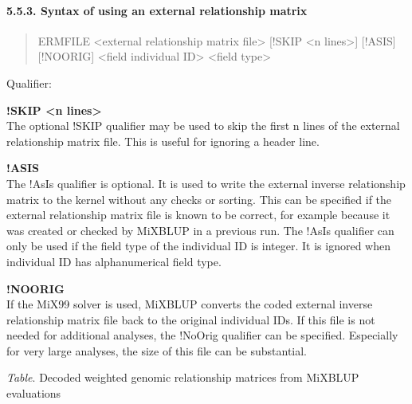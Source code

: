 \paragraph{5.5.3. Syntax of using an external relationship
matrix}\label{Gene57}

\begin{quote}
ERMFILE \textless external relationship matrix file\textgreater{}
{[}!SKIP \textless n lines\textgreater{]} {[}!ASIS{]} {[}!NOORIG{]}
\textless field individual ID\textgreater{} \textless field
type\textgreater{}
\end{quote}

Qualifier:

\textbf{!SKIP \textless n lines\textgreater{}}\\
The optional !SKIP qualifier may be used to skip the first n lines of
the external relationship matrix file. This is useful for ignoring a
header line.

\textbf{!ASIS}\\
The !AsIs qualifier is optional. It is used to write the external
inverse relationship matrix to the kernel without any checks or sorting.
This can be specified if the external relationship matrix file is known
to be correct, for example because it was created or checked by MiXBLUP
in a previous run. The !AsIs qualifier can only be used if the field
type of the individual ID is integer. It is ignored when individual ID
has alphanumerical field type.

\textbf{!NOORIG}\\
If the MiX99 solver is used, MiXBLUP converts the coded external inverse
relationship matrix file back to the original individual IDs. If this
file is not needed for additional analyses, the !NoOrig qualifier can be
specified. Especially for very large analyses, the size of this file can
be substantial.

\emph{Table}. Decoded weighted genomic relationship matrices from
MiXBLUP evaluations


